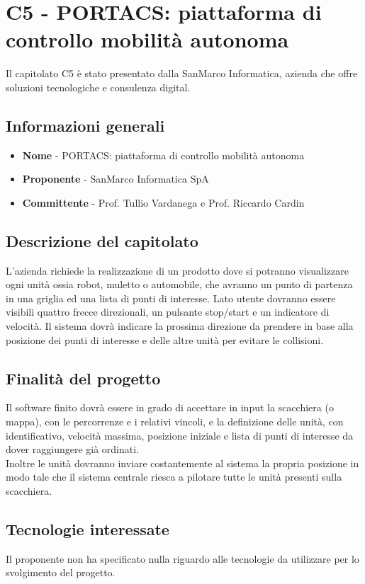 \chapter{C5 - PORTACS: piattaforma di controllo mobilità autonoma}
Il capitolato C5 è stato presentato dalla SanMarco Informatica, azienda che offre soluzioni tecnologiche e consulenza digital.
\section{Informazioni generali}
\begin{itemize}
	\item \textbf{Nome} - PORTACS: piattaforma di controllo mobilità autonoma
	\item \textbf{Proponente} - SanMarco Informatica SpA
	\item \textbf{Committente} - Prof. Tullio Vardanega e Prof. Riccardo Cardin
\end{itemize}
\section{Descrizione del capitolato}
L'azienda richiede la realizzazione di un prodotto dove si potranno visualizzare ogni unità ossia robot, muletto o automobile, che avranno un punto di partenza in una griglia ed una lista di punti di interesse. Lato utente dovranno essere visibili quattro frecce direzionali, un pulsante stop/start e un indicatore di velocità. Il sistema dovrà indicare la prossima direzione da prendere in base alla posizione dei punti di interesse e delle altre unità per evitare le collisioni.
\section{Finalità del progetto}
Il software finito dovrà essere in grado di accettare in input la scacchiera (o mappa), con le percorrenze e i relativi vincoli, e la definizione delle unità, con identificativo, velocità massima, posizione iniziale e lista di punti di interesse da dover raggiungere già ordinati. \\
Inoltre le unità dovranno inviare costantemente al sistema la propria posizione in modo tale che il sistema centrale riesca a pilotare tutte le unità presenti sulla scacchiera.
\section{Tecnologie interessate}
Il proponente non ha specificato nulla riguardo alle tecnologie da utilizzare per lo svolgimento del progetto.
